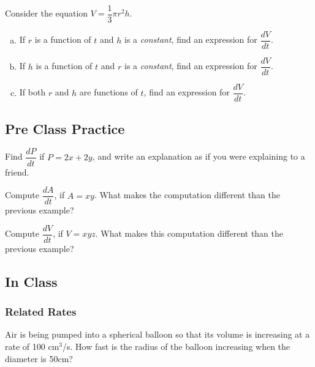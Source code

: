 \documentclass[notes]{subfiles}
\begin{document}
		\begin{ex}
			Consider the equation \(V = \dfrac{1}{3}\pi r^2 h\).
			\begin{enumerate}[(a)]
				\item If \(r\) is a function of \(t\) and \(h\) is a \emph{constant}, find an expression for \(\dfrac{dV}{dt}\).
					
				\item If \(h\) is a function of \(t\) and \(r\) is a \emph{constant}, find an expression for \(\dfrac{dV}{dt}\).
					
				\item If both \(r\) and \(h\) are functions of \(t\), find an expression for \(\dfrac{dV}{dt}\).
			\end{enumerate}
		\end{ex}
			\newpage
			
	\subsection*{Pre Class Practice}
		\begin{ex}
			Find \(\dfrac{dP}{dt}\) if \(P = 2x+2y\), and write an explanation as if you were explaining to a friend.
			\vs{1}
		\end{ex}
		
		\begin{ex}
			Compute \(\dfrac{dA}{dt}\), if \(A = xy\). What makes the computation different than the previous example?
		\end{ex}
			\vs{1}
		
		\begin{ex}
			Compute \(\dfrac{dV}{dt}\), if \(V = xyz\). What makes this computation different than the previous example?
		\end{ex}
			\newpage
			
	\subsection*{In Class}
	\subsubsection*{Related Rates}
		\begin{ex}
			Air is being pumped into a spherical balloon so that its volume is increasing at a rate of 100 cm\(^3\)/s.  How fast is the radius of the balloon increasing when the diameter is 50cm?
		\end{ex}
			
\end{document}
